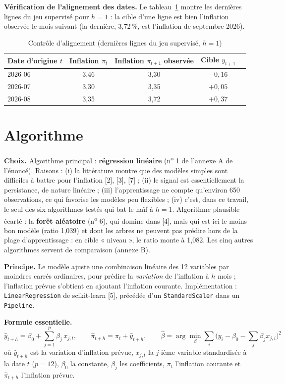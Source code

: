 \documentclass[11pt,a4paper]{article}
\begin{document}
\textbf{Vérification de l'alignement des dates.} Le tableau~\ref{tab:align} montre les dernières lignes du jeu supervisé pour $h=1$ : la cible d'une ligne est bien l'inflation observée le mois suivant (la dernière, 3,72\,\%, est l'inflation de septembre 2026).
\begin{table}[H]\centering\small
\caption{Contrôle d'alignement (dernières lignes du jeu supervisé, $h=1$)}\label{tab:align}
\begin{tabular}{@{}lcccc@{}}
\toprule
Date d'origine $t$ & Inflation $\pi_t$ & Inflation $\pi_{t+1}$ observée & Cible $y_{t+1}$\\\midrule
2026-06 & 3,46 & 3,30 & $-0{,}16$\\
2026-07 & 3,30 & 3,35 & $+0{,}05$\\
2026-08 & 3,35 & 3,72 & $+0{,}37$\\
\bottomrule
\end{tabular}
\end{table}

\section{Algorithme}
\textbf{Choix.} Algorithme principal : \textbf{régression linéaire} (n\textsuperscript{o} 1 de l'annexe A de l'énoncé). Raisons : (i) la littérature montre que des modèles simples sont difficiles à battre pour l'inflation [2], [3], [7] ; (ii) le signal est essentiellement la persistance, de nature linéaire ; (iii) l'apprentissage ne compte qu'environ 650 observations, ce qui favorise les modèles peu flexibles ; (iv) c'est, dans ce travail, le seul des six algorithmes testés qui bat le naïf à $h=1$. Algorithme plausible écarté : la \textbf{forêt aléatoire} (n\textsuperscript{o} 6), qui domine dans [4], mais qui est ici le moins bon modèle (ratio 1,039) et dont les arbres ne peuvent pas prédire hors de la plage d'apprentissage : en cible « niveau », le ratio monte à 1,082. Les cinq autres algorithmes servent de comparaison (annexe B).

\textbf{Principe.} Le modèle ajuste une combinaison linéaire des 12 variables par moindres carrés ordinaires, pour prédire la \emph{variation} de l'inflation à $h$ mois ; l'inflation prévue s'obtient en ajoutant l'inflation courante. Implémentation : \texttt{LinearRegression} de scikit-learn [5], précédée d'un \texttt{StandardScaler} dans un \texttt{Pipeline}.

\textbf{Formule essentielle.}
\begin{equation}
\hat y_{t+h}=\beta_0+\sum_{j=1}^{p}\beta_j\,x_{j,t},\qquad \hat\pi_{t+h}=\pi_t+\hat y_{t+h},\qquad \hat\beta=\arg\min_{\beta}\sum_{i}\Big(y_i-\beta_0-\sum_{j}\beta_j x_{j,i}\Big)^2
\end{equation}
où $\hat y_{t+h}$ est la variation d'inflation prévue, $x_{j,t}$ la $j$-ième variable standardisée à la date $t$ ($p=12$), $\beta_0$ la constante, $\beta_j$ les coefficients, $\pi_t$ l'inflation courante et $\hat\pi_{t+h}$ l'inflation prévue.
\end{document}
